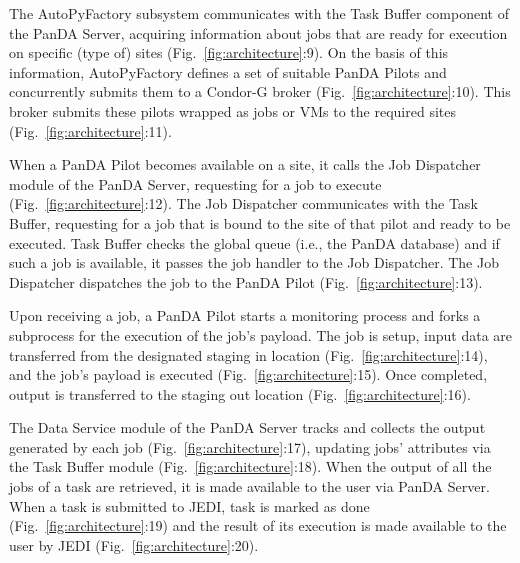 The AutoPyFactory subsystem communicates with the Task Buffer component of the
PanDA Server, acquiring information about jobs that are ready for execution on
specific (type of) sites (Fig.~\ref{fig:architecture}:9). On the basis of this
information, AutoPyFactory defines a set of suitable PanDA Pilots and
concurrently submits them to a Condor-G broker (Fig.~\ref{fig:architecture}:10).
This broker submits these pilots wrapped as jobs or VMs to the required sites
(Fig.~\ref{fig:architecture}:11).


When a PanDA Pilot becomes available on a site, it
calls the Job Dispatcher module of the PanDA Server, requesting for a job to
execute (Fig.~\ref{fig:architecture}:12). The Job Dispatcher communicates with
the Task Buffer, requesting for a job that is bound to the site of that pilot
and ready to be executed. Task Buffer checks the global queue (i.e., the PanDA
database) and if such a job is available, it passes the job handler to the Job
Dispatcher. The Job Dispatcher dispatches the job to the PanDA Pilot
(Fig.~\ref{fig:architecture}:13).


Upon receiving a job, a PanDA Pilot starts a monitoring process and forks a
subprocess for the execution of the job's payload. The job is setup, input data
are transferred from the designated staging in location
(Fig.~\ref{fig:architecture}:14), and the job's payload is executed
(Fig.~\ref{fig:architecture}:15). Once completed, output is transferred to the
staging out location (Fig.~\ref{fig:architecture}:16).


The Data Service module of the PanDA Server tracks and collects the output
generated by each job (Fig.~\ref{fig:architecture}:17), updating jobs'
attributes via the Task Buffer module (Fig.~\ref{fig:architecture}:18). When the
output of all the jobs of a task are retrieved, it is made available to the user
via PanDA Server. When a task is submitted to JEDI, task is marked as done
(Fig.~\ref{fig:architecture}:19) and the result of its execution is made
available to the user by JEDI (Fig.~\ref{fig:architecture}:20).

